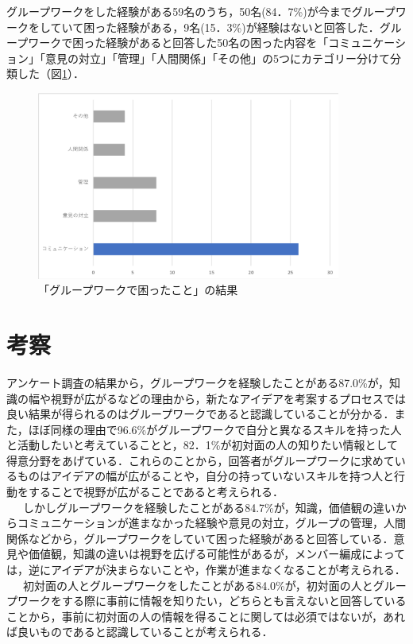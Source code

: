 \documentclass{funthesis}
\begin{document}
グループワークをした経験がある59名のうち，50名(84．7\%)が今までグループワークをしていて困った経験がある，9名(15．3\%)が経験はないと回答した．グループワークで困った経験があると回答した50名の困った内容を「コミュニケーション」「意見の対立」「管理」「人間関係」「その他」の5つにカテゴリー分けて分類した（図\ref{graph4}）．

\begin{figure}[H]
 \centering
   \includegraphics[width=100mm]{figures/finalchart4.png}
 \caption{「グループワークで困ったこと」の結果}
 \label{graph4}
\end{figure}


\section{考察}

アンケート調査の結果から，グループワークを経験したことがある87.0\%が，知識の幅や視野が広がるなどの理由から，新たなアイデアを考案するプロセスでは良い結果が得られるのはグループワークであると認識していることが分かる．また，ほぼ同様の理由で96.6\%がグループワークで自分と異なるスキルを持った人と活動したいと考えていることと，82．1\%が初対面の人の知りたい情報として得意分野をあげている．これらのことから，回答者がグループワークに求めているものはアイデアの幅が広がることや，自分の持っていないスキルを持つ人と行動をすることで視野が広がることであると考えられる．\\
\ \ \ しかしグループワークを経験したことがある84.7\%が，知識，価値観の違いからコミュニケーションが進まなかった経験や意見の対立，グループの管理，人間関係などから，グループワークをしていて困った経験があると回答している．意見や価値観，知識の違いは視野を広げる可能性があるが，メンバー編成によっては，逆にアイデアが決まらないことや，作業が進まなくなることが考えられる．\\
\ \ \ 初対面の人とグループワークをしたことがある84.0\%が，初対面の人とグループワークをする際に事前に情報を知りたい，どちらとも言えないと回答していることから，事前に初対面の人の情報を得ることに関しては必須ではないが，あれば良いものであると認識していることが考えられる．\\
\end{document}
